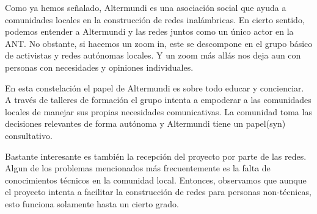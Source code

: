 Como ya hemos señalado, Altermundi es una asociación social que ayuda a comunidades locales en la construcción de redes inalámbricas.
En cierto sentido, podemos entender a Altermundi y las redes juntos como un único actor en la ANT.
No obstante, si hacemos un zoom in, este se descompone en el grupo básico de activistas y redes autónomas locales.
Y un zoom más allás nos deja aun con personas con necesidades y opiniones individuales.

En esta constelación el papel de Altermundi es sobre todo educar y concienciar.
A través de talleres de formación el grupo intenta a empoderar a las comunidades locales de manejar sus propias necesidades comunicativas.
La comunidad toma las decisiones relevantes de forma autónoma y Altermundi tiene un papel(syn) consultativo.


Bastante interesante es también la recepción del proyecto por parte de las redes.
Algun de los problemas mencionados más frecuentemente es la falta de conocimientos técnicos en la comunidad local.
Entonces, observamos que aunque el proyecto intenta a facilitar la construcción de redes para personas non-técnicas, esto funciona solamente hasta un cierto grado.

